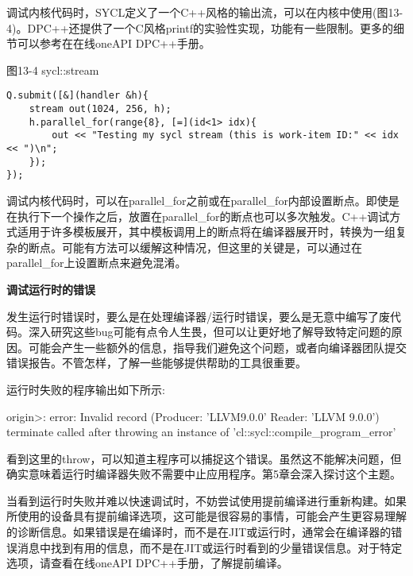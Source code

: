 调试内核代码时，SYCL定义了一个C++风格的输出流，可以在内核中使用(图13-4)。DPC++还提供了一个C风格printf的实验性实现，功能有一些限制。更多的细节可以参考在在线oneAPI DPC++手册。\par

\hspace*{\fill} \par %
图13-4 sycl::stream
\begin{lstlisting}[caption={}]
Q.submit([&](handler &h){
	stream out(1024, 256, h);
	h.parallel_for(range{8}, [=](id<1> idx){
		out << "Testing my sycl stream (this is work-item ID:" << idx << ")\n";
	});
});
\end{lstlisting}

调试内核代码时，可以在parallel\_for之前或在parallel\_for内部设置断点。即使是在执行下一个操作之后，放置在parallel\_for的断点也可以多次触发。C++调试方式适用于许多模板展开，其中模板调用上的断点将在编译器展开时，转换为一组复杂的断点。可能有方法可以缓解这种情况，但这里的关键是，可以通过在parallel\_for上设置断点来避免混淆。\par

\hspace*{\fill} \par %
\textbf{调试运行时的错误}

发生运行时错误时，要么是在处理编译器/运行时错误，要么是无意中编写了废代码。深入研究这些bug可能有点令人生畏，但可以让更好地了解导致特定问题的原因。可能会产生一些额外的信息，指导我们避免这个问题，或者向编译器团队提交错误报告。不管怎样，了解一些能够提供帮助的工具很重要。\par

运行时失败的程序输出如下所示:\par

\begin{tcolorbox}[colback=white,colframe=black]
origin>: error: Invalid record (Producer: 'LLVM9.0.0' Reader: 'LLVM 9.0.0')\\
terminate called after throwing an instance of 'cl::sycl::compile\_program\_error'
\end{tcolorbox}

看到这里的throw，可以知道主程序可以捕捉这个错误。虽然这不能解决问题，但确实意味着运行时编译器失败不需要中止应用程序。第5章会深入探讨这个主题。\par

当看到运行时失败并难以快速调试时，不妨尝试使用提前编译进行重新构建。如果所使用的设备具有提前编译选项，这可能是很容易的事情，可能会产生更容易理解的诊断信息。如果错误是在编译时，而不是在JIT或运行时，通常会在编译器的错误消息中找到有用的信息，而不是在JIT或运行时看到的少量错误信息。对于特定选项，请查看在线oneAPI DPC++手册，了解提前编译。\par

